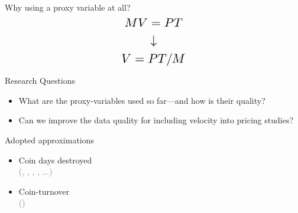 \documentclass{beamer}
\newcommand{\deemphtext}[1]{\textcolor{gray}{{#1}}}
\newcommand{\emphtext}[1]{\textcolor{hublue}{{#1}}}
\begin{document}



\begin{frame}{Why using a proxy variable at all?}
  \[ \scalebox{1.5}{$MV=PT$} \]  
  \[ \scalebox{1.5}{$\downarrow$} \]
  \[ \scalebox{1.5}{$V=PT/M$} \]  

\end{frame}


\begin{frame}{Research Questions}
  \begin{itemize}
  \item What are the proxy-variables used so far---and how is their quality?
  \item Can we improve the data quality for including velocity into pricing studies?
  \end{itemize}
\end{frame}



\begin{frame}{Adopted approximations}

  \begin{itemize}
  \item Coin days destroyed\\
    \deemphtext{(\cite{deleo2014does}, \cite{georgoula2015using}, \cite{bouoiyour2015does}, \cite{luis2019drivers}, ...)}
  \item Coin-turnover \\
    \deemphtext{(\cite{smith2017bitcoin})}
  \end{itemize}
  \vspace{1em}

\end{frame}
\end{document}
